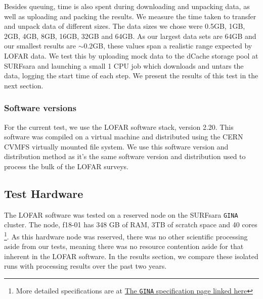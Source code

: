 Besides queuing, time is also spent during downloading and unpacking data, as well as uploading and packing the results. We measure the time taken to transfer and unpack data of different sizes. The data sizes we chose were 0.5GB, 1GB, 2GB, 4GB, 8GB, 16GB, 32GB and 64GB. As our largest data sets are 64GB and our smallest results are $\sim$0.2GB, these values span a realistic range expected by LOFAR data. We test this by uploading mock data to the dCache storage pool at SURFsara and launching a small 1 CPU job which downloads and untars the data, logging the start time of each step. We present the results of this test in the next section. 


\subsubsection{Software versions}\label{sec:software_versions}
For the current test, we use the LOFAR software stack, version 2.20. This software was compiled on a virtual machine and distributed using the CERN CVMFS virtually mounted file system. We use this software version and distribution method as it's the same software version and distribution used to process the bulk of the LOFAR surveys. 

\subsection{Test Hardware}

The LOFAR software was tested on a reserved node on the SURFsara \texttt{GINA} cluster. The node, f18-01 has 348 GB of RAM, 3TB of scratch space and 40 cores \footnote{More detailed specifications are at \href{http://docs.surfsaralabs.nl/projects/grid/en/latest/Pages/Service/system_specifications/gina_specs.html}{The \texttt{GINA} specification page linked here}}. As this hardware node was reserved, there was no other scientific processing aside from our tests, meaning there was no resource contention aside for that inherent in the LOFAR software. In the results section, we compare these isolated runs with processing results over the past two years. 